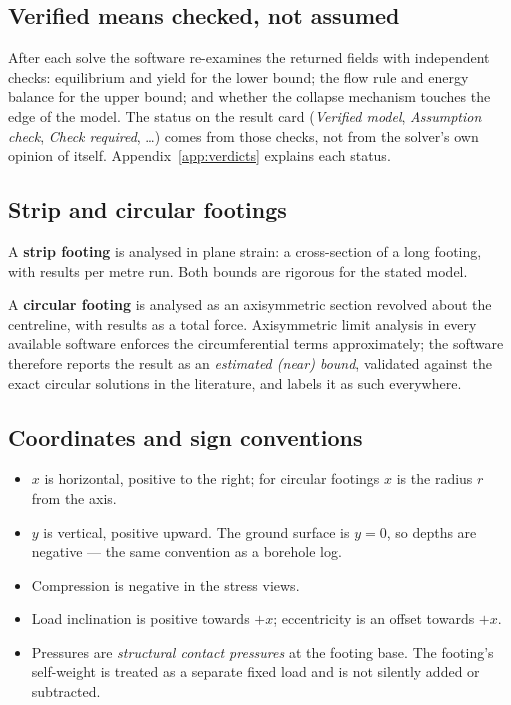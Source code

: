 \documentclass[11pt,a4paper]{article}
\begin{document}
\subsection{Verified means checked, not assumed}
After each solve the software re-examines the returned fields with independent checks: equilibrium and yield for the lower bound; the flow rule and energy balance for the upper bound; and whether the collapse mechanism touches the edge of the model. The status on the result card (\emph{Verified model}, \emph{Assumption check}, \emph{Check required}, \ldots) comes from those checks, not from the solver's own opinion of itself. Appendix~\ref{app:verdicts} explains each status.

\subsection{Strip and circular footings}
A \textbf{strip footing} is analysed in plane strain: a cross-section of a long footing, with results per metre run. Both bounds are rigorous for the stated model.

A \textbf{circular footing} is analysed as an axisymmetric section revolved about the centreline, with results as a total force. Axisymmetric limit analysis in every available software enforces the circumferential terms approximately; the software therefore reports the result as an \emph{estimated (near) bound}, validated against the exact circular solutions in the literature, and labels it as such everywhere.

\subsection{Coordinates and sign conventions}
\begin{itemize}
  \item $x$ is horizontal, positive to the right; for circular footings $x$ is the radius $r$ from the axis.
  \item $y$ is vertical, positive upward. The ground surface is $y = 0$, so depths are negative --- the same convention as a borehole log.
  \item Compression is negative in the stress views.
  \item Load inclination is positive towards $+x$; eccentricity is an offset towards $+x$.
  \item Pressures are \emph{structural contact pressures} at the footing base. The footing's self-weight is treated as a separate fixed load and is not silently added or subtracted.
\end{itemize}
\end{document}

